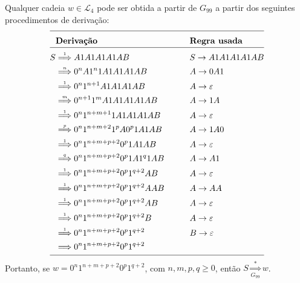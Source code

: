 \documentclass[12pt]{article}
\def\myling{{4}} %
\newcommand{\deriv}[1]{\stackrel{\scriptscriptstyle #1}{\Longrightarrow}}
\newcommand{\derivG}[2]{\mathop{\Longrightarrow}\limits_{\scriptscriptstyle #2}^{\scriptscriptstyle #1}}
\begin{document}
\begin{tcolorbox}[breakable,rounded corners, colback=yellow!5, colframe=red!40!black, title={$\mathcal{L}_{\myling} \subseteq\mathcal{L}(G_{99})$, ou seja, se $w\in \mathcal{L}_{\myling}$, então $S \deriv{*} w$.}]
Qualquer cadeia $w\in \mathcal{L}_{\myling}$ pode ser obtida a partir de $G_{99}$ a partir dos seguintes procedimentos de derivação:
		\begin{alignat*}{2}
		\cline{1-4}
		   & \textbf{Derivação}   &\qquad& \textbf{Regra usada}\\[-10pt]
		\cline{1-4}
		 S & \deriv{1} A1A1A1A1AB                   & &S \to A1A1A1A1AB   \\
           & \deriv{n} 0^nA1^n1A1A1A1AB             & &A \to 0A1          \\ 
		   & \deriv{1} 0^n1^{n+1}A1A1A1AB           & &A \to \varepsilon  \\
           & \deriv{m} 0^{n+1}1^mA1A1A1A1AB         & &A \to 1A           \\
           & \deriv{1} 0^n1^{n+m+1}1A1A1A1AB        & &A \to \varepsilon  \\
           & \deriv{p} 0^n1^{n+m+2}1^pA0^p1A1AB     & &A \to 1A0          \\
           & \deriv{1} 0^n1^{n+m+p+2}0^p1A1AB       & &A \to \varepsilon  \\
           & \deriv{q} 0^n1^{n+m+p+2}0^p1A1^q1AB    & &A \to A1           \\
           & \deriv{1} 0^n1^{n+m+p+2}0^p1^{q+2}AB   & &A \to \varepsilon  \\
           & \deriv{1} 0^n1^{n+m+p+2}0^p1^{q+2}AAB  & &A \to AA           \\
           & \deriv{1} 0^n1^{n+m+p+2}0^p1^{q+2}AB    & &A \to \varepsilon \\
           & \deriv{1} 0^n1^{n+m+p+2}0^p1^{q+2}B    & &A \to \varepsilon  \\
           & \deriv{1} 0^n1^{n+m+p+2}0^p1^{q+2}     & &B \to \varepsilon  \\
	       & \deriv{}  0^n1^{n+m+p+2}0^p1^{q+2}     & & \\[-8pt]
		\cline{1-4}
		\end{alignat*}
  Portanto, se $w = 0^n1^{n+m+p+2}0^p1^{q+2}$, com $n,m,p,q \geqslant 0$, então $S \derivG{*}{G_{99}} w$.
\end{tcolorbox}
\end{document}

